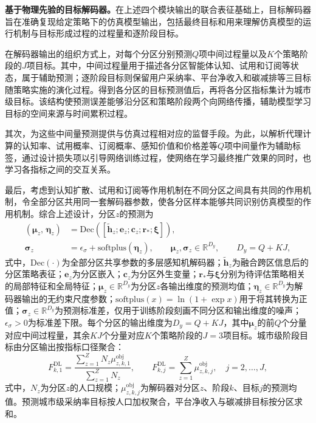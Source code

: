 \textbf{基于物理先验的目标解码器。}在上述四个模块输出的联合表征基础上，目标解码器旨在准确复现给定策略下的仿真模型输出，包括最终目标和用来理解仿真模型的运行机制与目标形成过程的过程量和逐阶段目标。

在解码器输出的组织方式上，对每个分区分别预测$Q$项中间过程量以及$K$个策略阶段的$J$项目标。其中，中间过程量用于描述各分区智能体认知、试用和订阅等状态，属于辅助预测；逐阶段目标则保留用户采纳率、平台净收入和碳减排等三目标随策略实施的演化过程。得到各分区的目标预测值后，再将各分区指标集计为城市级目标。该结构使预测误差能够沿分区和策略阶段两个向网络传播，辅助模型学习目标的空间来源与时间累积过程。

其次，为这些中间量预测提供与仿真过程相对应的监督手段。为此，以解析代理计算的认知率、试用概率、订阅概率、感知价值和价格差等$Q$项中间量作为辅助标签，通过设计损失项以引导网络训练过程，使网络在学习最终推广效果的同时，也学习各指标之间的交互关系。

最后，考虑到认知扩散、试用和订阅等作用机制在不同分区之间具有共同的作用机制，令全部分区共用同一套解码器参数，使各分区样本能够共同识别仿真模型的作用机制。综合上述设计，分区$z$的预测为
\begin{equation}
\begin{aligned}
\left(\bm{\mu}_{z},\,\bm{\eta}_{z}\right)
&=\mathrm{Dec}\left(
\left[
\tilde{\bm{h}}_{z};
\bm{e}_{z};
\bm{c}_{z};
\bm{r}_{*};
\bm{\xi}
\right]
\right),\\
\bm{\sigma}_{z}
&=\epsilon_{\sigma}
+\mathrm{softplus}\left(\bm{\eta}_{z}\right),\qquad
\bm{\mu}_{z},\bm{\sigma}_{z}\in\mathbb{R}^{D_y},\qquad
D_y=Q+KJ,
\end{aligned}
\label{eq.opt.decoder}
\end{equation}
式中，$\mathrm{Dec}(\cdot)$为全部分区共享参数的多层感知机解码器；$\widetilde{\bm h}_z$为融合跨区信息后的分区策略表征；$\bm e_z$为分区嵌入；$\bm c_z$为分区外生变量；$\bm r_*$与$\bm\xi$分别为待评估策略相关的局部特征和全局特征；$\bm\mu_z\in\mathbb{R}^{D_y}$为分区$z$各输出维度的预测均值；$\bm\eta_z\in\mathbb{R}^{D_y}$为解码器输出的无约束尺度参数；$\mathrm{softplus}(x)=\ln(1+\exp x)$用于将其转换为正值；$\bm\sigma_z\in\mathbb{R}^{D_y}$为预测标准差，仅用于训练阶段刻画不同分区和输出维度的噪声；$\epsilon_\sigma>0$为标准差下限。每个分区的输出维度为$D_y=Q+KJ$，其中$\bm\mu_z$的前$Q$个分量对应中间过程量，其余$KJ$个分量对应$K$个策略阶段的$J=3$项目标。城市级阶段目标由分区输出按指标口径聚合：
\begin{equation}
F_{k,1}^{\mathrm{DL}}
=\frac{\sum_{z=1}^{Z}N_z\mu_{z,k,1}^{\mathrm{obj}}}
{\sum_{z=1}^{Z}N_z},
\qquad
F_{k,j}^{\mathrm{DL}}
=\sum_{z=1}^{Z}\mu_{z,k,j}^{\mathrm{obj}},
\quad j=2,\ldots,J,
\label{eq.opt.dlagg}
\end{equation}
式中，$N_z$为分区$z$的人口规模；$\mu_{z,k,j}^{\mathrm{obj}}$为解码器对分区$z$、阶段$k$、目标$j$的预测均值。预测城市级采纳率目标按人口加权聚合，平台净收入与碳减排目标按分区求和。

